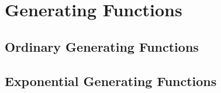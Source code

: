 
\chapter{Generating Functions}




\section{Ordinary Generating Functions}


\section{Exponential Generating Functions}



\endinput
